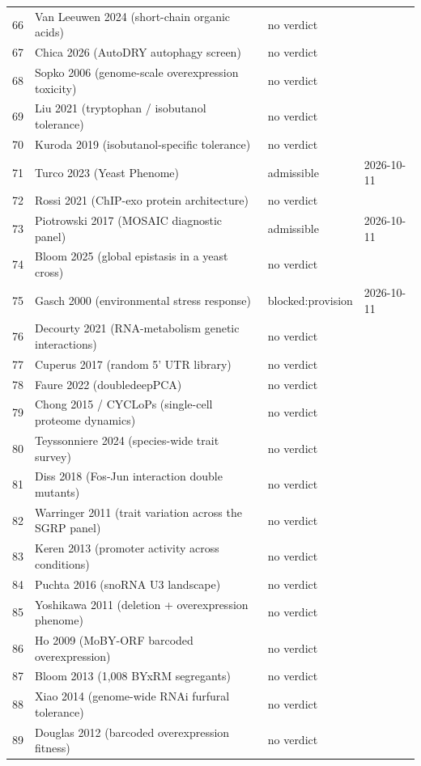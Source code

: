 \begin{longtable}{@{}r L{88mm} L{40mm} L{24mm}@{}}
66 & Van Leeuwen 2024 (short-chain organic acids) & no verdict &  \\
67 & Chica 2026 (AutoDRY autophagy screen) & no verdict &  \\
68 & Sopko 2006 (genome-scale overexpression toxicity) & no verdict &  \\
69 & Liu 2021 (tryptophan / isobutanol tolerance) & no verdict &  \\
70 & Kuroda 2019 (isobutanol-specific tolerance) & no verdict &  \\
71 & Turco 2023 (Yeast Phenome) & admissible & 2026-10-11 \\
72 & Rossi 2021 (ChIP-exo protein architecture) & no verdict &  \\
73 & Piotrowski 2017 (MOSAIC diagnostic panel) & admissible & 2026-10-11 \\
74 & Bloom 2025 (global epistasis in a yeast cross) & no verdict &  \\
75 & Gasch 2000 (environmental stress response) & blocked:provision & 2026-10-11 \\
76 & Decourty 2021 (RNA-metabolism genetic interactions) & no verdict &  \\
77 & Cuperus 2017 (random 5' UTR library) & no verdict &  \\
78 & Faure 2022 (doubledeepPCA) & no verdict &  \\
79 & Chong 2015 / CYCLoPs (single-cell proteome dynamics) & no verdict &  \\
80 & Teyssonniere 2024 (species-wide trait survey) & no verdict &  \\
81 & Diss 2018 (Fos-Jun interaction double mutants) & no verdict &  \\
82 & Warringer 2011 (trait variation across the SGRP panel) & no verdict &  \\
83 & Keren 2013 (promoter activity across conditions) & no verdict &  \\
84 & Puchta 2016 (snoRNA U3 landscape) & no verdict &  \\
85 & Yoshikawa 2011 (deletion + overexpression phenome) & no verdict &  \\
86 & Ho 2009 (MoBY-ORF barcoded overexpression) & no verdict &  \\
87 & Bloom 2013 (1,008 BYxRM segregants) & no verdict &  \\
88 & Xiao 2014 (genome-wide RNAi furfural tolerance) & no verdict &  \\
89 & Douglas 2012 (barcoded overexpression fitness) & no verdict &  \\

\end{longtable}
